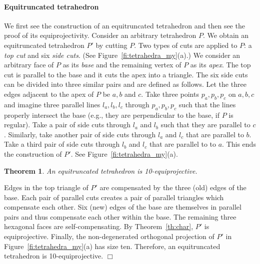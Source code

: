 \documentclass{article}
\newtheorem{theorem}{Theorem}
\newenvironment{proof}
{{\noindent\bf Proof}}{$\Box$}
\begin{document}
\paragraph{Equitruncated tetrahedron}
We first see the construction of an equitruncated tetrahedron and then see the proof of its equiprojectivity.
Consider an arbitrary tetrahedron $P$.
We obtain an equitruncated tetrahedron $P'$ by cutting $P$.
Two types of cuts are applied to $P$: a \emph{top cut} and six \emph{side cuts}. 
(See Figure~\ref{fi:tetrahedra_my}(a).)
We consider an arbitrary face of $P$ as its \emph{base}
and the remaining vertex of $P$ as its \emph{apex}. 
The top cut is parallel to the base and it cuts the apex into a triangle.
The six side cuts can be divided into three similar pairs and are defined as follows.
Let the three edges adjacent to the apex of $P$ be $a,b$ and $c$.
Take three points $p_a, p_b,p_c$ on $a,b,c$ and imagine three parallel lines $l_a,l_b,l_c$ 
through $p_a, p_b,p_c$ such that the lines properly intersect the base
(e.g., they are perpendicular to the base, if $P$ is regular).
Take a pair of side cuts through $l_a$ and $l_b$ such that they are parallel to $c$.
Similarly, take another pair of side cuts through $l_a$ and $l_c$ that are parallel to $b$.
Take a third pair of side cuts through $l_b$ and $l_c$ that are parallel to to $a$.
This ends the construction of $P'$. See Figure~\ref{fi:tetrahedra_my}(a).

\begin{theorem}
\label{th:P1}
An equitruncated tetrahedron is 10-equiprojective.
\end{theorem}

\begin{proof}
Edges in the top triangle of $P'$ are compensated by the three (old) edges of the base.
Each pair of parallel cuts creates a pair of parallel triangles
which compensate each other.
Six (new) edges of the base are themselves in parallel pairs 
and thus compensate each other within the base. 
The remaining three hexagonal faces are self-compensating.
By Theorem~\ref{th:char}, $P'$ is equiprojective.
Finally, the non-degenerated orthogonal projection of $P'$ in Figure~\ref{fi:tetrahedra_my}(a) 
has size ten.
Therefore, an equitruncated tetrahedron is 10-equiprojective.
\end{proof}
\end{document}
